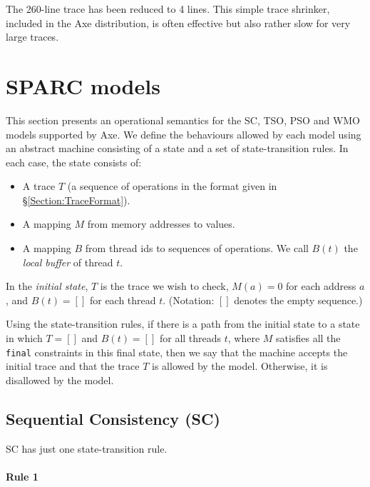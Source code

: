 \documentclass[11pt]{article}
\begin{document}
\noindent The 260-line trace has been reduced to 4 lines.  This simple
trace shrinker, included in the Axe distribution, is often effective
but also rather slow for very large traces.

\section{SPARC models}
\label{Section:SPARCModels}

This section presents an operational semantics for the SC, TSO, PSO
and WMO models supported by Axe.  We define the behaviours allowed by
each model using an abstract machine consisting of a state and a set
of state-transition rules.  In each case, the state consists of:

\begin{itemize}

\item A trace $T$ (a sequence of operations in the format given in
\S\ref{Section:TraceFormat}).

\item A mapping $M$ from memory addresses to values.

\item A mapping $B$ from thread ids to sequences of operations.  We
call $B(t)$ the \emph{local buffer} of thread $t$.

\end{itemize}

In the \emph{initial state}, $T$ is the trace we wish to check, $M(a)
= 0$ for each address $a$, and $B(t) = []$ for each thread $t$.
(Notation: $[]$ denotes the empty sequence.)

Using the state-transition rules, if there is a path from the initial
state to a state in which $T = []$ and $B(t) = []$ for all threads
$t$, where $M$ satisfies all the \verb#final# constraints in this
final state, then we say that the machine accepts the initial trace
and that the trace $T$ is allowed by the model.  Otherwise, it is
disallowed by the model.

\subsection{Sequential Consistency (SC)}

SC has just one state-transition rule.

\paragraph{Rule 1}
\end{document}
